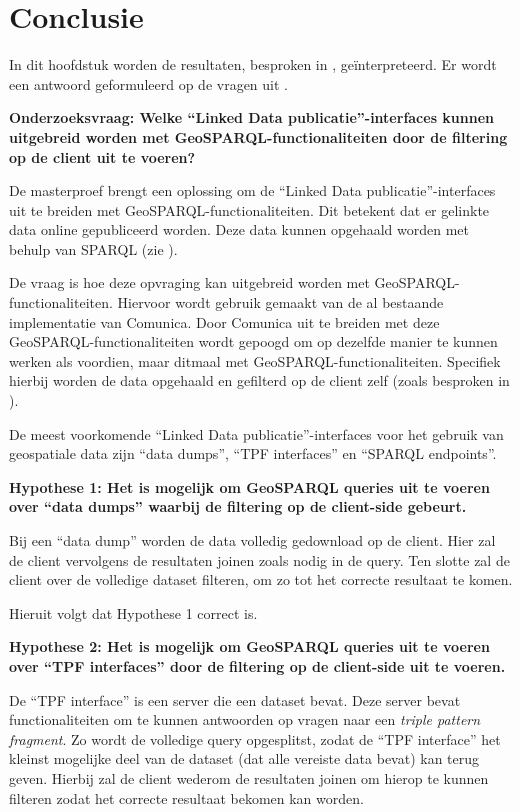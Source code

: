 \chapter{Conclusie}
\label{chap:conclusie}
In dit hoofdstuk worden de resultaten, besproken in , geïnterpreteerd. Er wordt een antwoord geformuleerd op de vragen uit .

\textbf{Onderzoeksvraag: Welke ``Linked Data publicatie''-interfaces kunnen uitgebreid worden met GeoSPARQL-functionaliteiten door de filtering op de client uit te voeren?}

De masterproef brengt een oplossing om de ``Linked Data publicatie''-interfaces uit te breiden met GeoSPARQL-functionaliteiten. Dit betekent dat er gelinkte data online gepubliceerd worden. Deze data kunnen opgehaald worden met behulp van SPARQL (zie ). 

De vraag is hoe deze opvraging kan uitgebreid worden met GeoSPARQL-functionaliteiten. Hiervoor wordt gebruik gemaakt van de al bestaande implementatie van Comunica. Door Comunica uit te breiden met deze GeoSPARQL-functionaliteiten wordt gepoogd om op dezelfde manier te kunnen werken als voordien, maar ditmaal met GeoSPARQL-functionaliteiten. Specifiek hierbij worden de data opgehaald en gefilterd op de client zelf (zoals besproken in ).

De meest voorkomende ``Linked Data publicatie''-interfaces voor het gebruik van geospatiale data zijn ``data dumps'', ``TPF interfaces'' en ``SPARQL endpoints''.

\textbf{Hypothese 1: Het is mogelijk om GeoSPARQL queries uit te voeren over ``data dumps'' waarbij de filtering op de client-side gebeurt.}

Bij een ``data dump'' worden de data volledig gedownload op de client. Hier zal de client vervolgens de resultaten joinen zoals nodig in de query. Ten slotte zal de client over de volledige dataset filteren, om zo tot het correcte resultaat te komen. 

Hieruit volgt dat Hypothese 1 correct is.

\textbf{Hypothese 2: Het is mogelijk om GeoSPARQL queries uit te voeren over ``TPF interfaces'' door de filtering op de client-side uit te voeren.}

De ``TPF interface'' is een server die een dataset bevat. Deze server bevat functionaliteiten om te kunnen antwoorden op vragen naar een \textit{triple pattern fragment}. Zo wordt de volledige query opgesplitst, zodat de ``TPF interface'' het kleinst mogelijke deel van de dataset (dat alle vereiste data bevat) kan terug geven. Hierbij zal de client wederom de resultaten joinen om hierop te kunnen filteren zodat het correcte resultaat bekomen kan worden.

